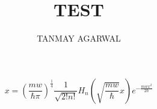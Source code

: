 \documentclass{Article}
\begin{document}
\title{TEST}
\author{TANMAY AGARWAL}
\maketitle 
\begin{equation}
x=(\frac{mw}{\hbar \pi})^{\frac{1}{4}} \frac{1}{\sqrt{2!n!}} H_n(\sqrt{\frac{mw}{\hbar}}x) e^{-\frac{mwx^2}{2\hbar}}
\end{equation}
\end{document}
